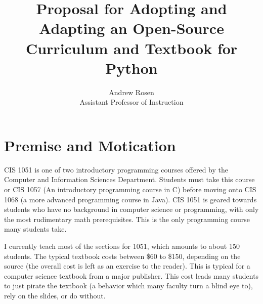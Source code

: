 \documentclass[]{article}
\title{Proposal for Adopting and Adapting an Open-Source Curriculum and Textbook for Python }
\author{Andrew Rosen\\ Assistant Professor of Instruction}
\begin{document}
%
%
%
%
%
%
%
%



\maketitle

\section{Premise and Motication}
CIS 1051 is one of two introductory programming courses offered by the Computer and Information Sciences Department.  
Students must take this course or CIS 1057 (An introductory programming course in C) before moving onto CIS 1068 (a more advanced programming course in Java). CIS 1051 is geared towards students who have no background in computer science or programming, with only the most rudimentary math prerequisites.  This is the only programming course many students take.

I currently teach most of the sections for 1051, which amounts to about 150 students.  
The typical textbook costs between \$60 to \$150, depending on the source (the overall cost is left as an exercise to the reader).
This is typical for a computer science textbook from a major publisher.
This cost leads many students to just pirate the textbook (a behavior which many faculty turn a blind eye to), rely on the slides, or do without.
\end{document}
